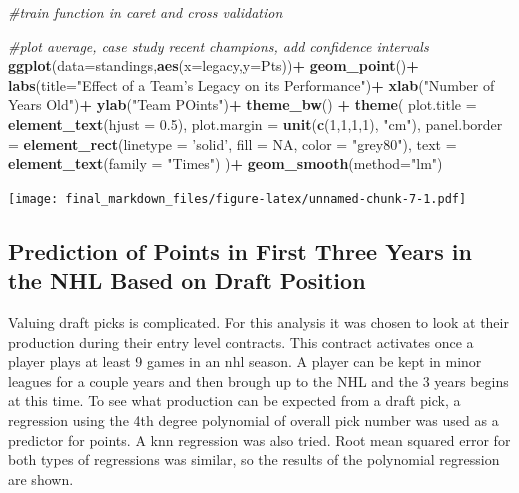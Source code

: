 \documentclass[]{article}
\newenvironment{Shaded}{\begin{snugshade}}{\end{snugshade}}
\newcommand{\CommentTok}[1]{\textcolor[rgb]{0.56,0.35,0.01}{\textit{#1}}}
\newcommand{\DataTypeTok}[1]{\textcolor[rgb]{0.13,0.29,0.53}{#1}}
\newcommand{\DecValTok}[1]{\textcolor[rgb]{0.00,0.00,0.81}{#1}}
\newcommand{\FloatTok}[1]{\textcolor[rgb]{0.00,0.00,0.81}{#1}}
\newcommand{\KeywordTok}[1]{\textcolor[rgb]{0.13,0.29,0.53}{\textbf{#1}}}
\newcommand{\NormalTok}[1]{#1}
\newcommand{\OperatorTok}[1]{\textcolor[rgb]{0.81,0.36,0.00}{\textbf{#1}}}
\newcommand{\OtherTok}[1]{\textcolor[rgb]{0.56,0.35,0.01}{#1}}
\newcommand{\StringTok}[1]{\textcolor[rgb]{0.31,0.60,0.02}{#1}}
\begin{document}
\begin{Shaded}
\begin{Highlighting}[]
 \CommentTok{#train function in caret and cross validation}
 
 \CommentTok{#plot average, case study recent champions, add confidence intervals}
\KeywordTok{ggplot}\NormalTok{(}\DataTypeTok{data=}\NormalTok{standings,}\KeywordTok{aes}\NormalTok{(}\DataTypeTok{x=}\NormalTok{legacy,}\DataTypeTok{y=}\NormalTok{Pts))}\OperatorTok{+}
\StringTok{  }\KeywordTok{geom_point}\NormalTok{()}\OperatorTok{+}
\StringTok{  }\KeywordTok{labs}\NormalTok{(}\DataTypeTok{title=}\StringTok{"Effect of a Team's Legacy on its Performance"}\NormalTok{)}\OperatorTok{+}
\StringTok{  }\KeywordTok{xlab}\NormalTok{(}\StringTok{"Number of Years Old"}\NormalTok{)}\OperatorTok{+}
\StringTok{  }\KeywordTok{ylab}\NormalTok{(}\StringTok{"Team POints"}\NormalTok{)}\OperatorTok{+}
\StringTok{  }\KeywordTok{theme_bw}\NormalTok{() }\OperatorTok{+}
\StringTok{  }\KeywordTok{theme}\NormalTok{(}
    \DataTypeTok{plot.title =} \KeywordTok{element_text}\NormalTok{(}\DataTypeTok{hjust =} \FloatTok{0.5}\NormalTok{),}
    \DataTypeTok{plot.margin =} \KeywordTok{unit}\NormalTok{(}\KeywordTok{c}\NormalTok{(}\DecValTok{1}\NormalTok{,}\DecValTok{1}\NormalTok{,}\DecValTok{1}\NormalTok{,}\DecValTok{1}\NormalTok{), }\StringTok{"cm"}\NormalTok{),}
    \DataTypeTok{panel.border =} \KeywordTok{element_rect}\NormalTok{(}\DataTypeTok{linetype =} \StringTok{'solid'}\NormalTok{, }\DataTypeTok{fill =} \OtherTok{NA}\NormalTok{, }\DataTypeTok{color =} \StringTok{"grey80"}\NormalTok{),}
    \DataTypeTok{text =} \KeywordTok{element_text}\NormalTok{(}\DataTypeTok{family =} \StringTok{"Times"}\NormalTok{)}
\NormalTok{    )}\OperatorTok{+}
\StringTok{  }\KeywordTok{geom_smooth}\NormalTok{(}\DataTypeTok{method=}\StringTok{"lm"}\NormalTok{)}
\end{Highlighting}
\end{Shaded}

\texttt{[image: final\_markdown\_files/figure-latex/unnamed-chunk-7-1.pdf]}

\hypertarget{prediction-of-points-in-first-three-years-in-the-nhl-based-on-draft-position}{%
\subsection{Prediction of Points in First Three Years in the NHL Based
on Draft
Position}\label{prediction-of-points-in-first-three-years-in-the-nhl-based-on-draft-position}}

Valuing draft picks is complicated. For this analysis it was chosen to
look at their production during their entry level contracts. This
contract activates once a player plays at least 9 games in an nhl
season. A player can be kept in minor leagues for a couple years and
then brough up to the NHL and the 3 years begins at this time. To see
what production can be expected from a draft pick, a regression using
the 4th degree polynomial of overall pick number was used as a predictor
for points. A knn regression was also tried. Root mean squared error for
both types of regressions was similar, so the results of the polynomial
regression are shown.
\end{document}
